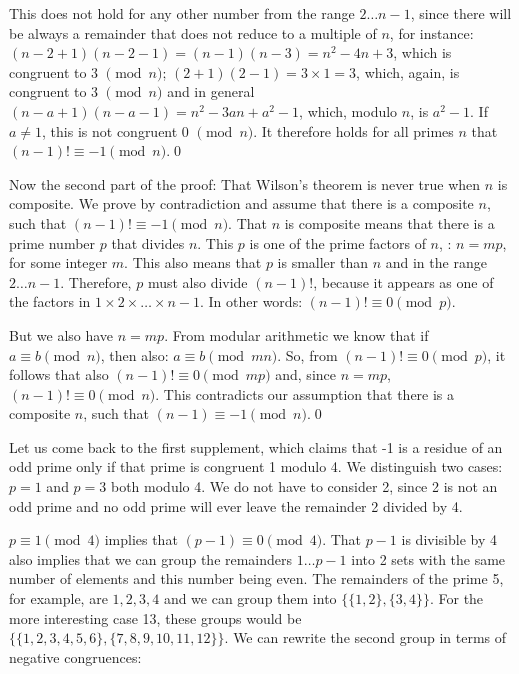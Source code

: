 \documentclass{scrreprt}
\begin{document}
This does not hold for any other number from the range $2\dots n-1$,
since there will be always a remainder that does not reduce
to a multiple of $n$, for instance:
$(n - 2 + 1) (n - 2 - 1) = (n - 1) (n - 3) = n^2 - 4n + 3$,
which is congruent to 3 $\pmod{n}$;
$(2 + 1) (2 - 1) = 3 \times 1 = 3$, which, again, 
is congruent to 3 $\pmod{n}$ and in general
$(n - a + 1)(n - a - 1) = n^2 - 3an + a^2 - 1$,
which, modulo $n$, is $a^2 - 1$.
If $a \neq 1$, this is not congruent 0 $\pmod{n}$.
It therefore holds for all primes $n$ 
that $(n - 1)! \equiv -1 \pmod{n}$.\qed

Now the second part of the proof:
That Wilson's theorem is never true when $n$ is composite.
We prove by contradiction and assume that there is a composite $n$,
such that $(n-1)! \equiv -1 \pmod{n}$.
That $n$ is composite means that there is a prime number $p$
that divides $n$.
This $p$ is one of the prime factors of $n$,
\ie: $n = mp$, for some integer $m$.
This also means that $p$ is smaller than $n$ and 
in the range $2\dots n-1$.
Therefore, $p$ must also divide $(n-1)!$, because 
it appears as one of the factors in $1 \times 2 \times \dots \times n-1$.
In other words: $(n-1)! \equiv 0 \pmod{p}$.

But we also have $n = mp$.
From modular arithmetic we know that 
if $a \equiv b \pmod{n}$, then also: $a \equiv b \pmod{mn}$.
So, from $(n-1)! \equiv 0 \pmod{p}$, it follows that also
$(n-1)! \equiv 0 \pmod{mp}$ and, since $n = mp$,
$(n-1)! \equiv 0 \pmod{n}$. This contradicts our assumption
that there is a composite $n$, such that
$(n-1) \equiv -1 \pmod{n}$.\qed

Let us come back to the first supplement,
which claims that -1 is a residue of an odd prime
only if that prime is congruent 1 modulo 4.
We distinguish two cases: 
$p = 1$ and $p = 3$ both modulo 4.
We do not have to consider 2, since 2 is not an odd prime
and no odd prime will ever leave the remainder 2 
divided by 4.

$p \equiv 1 \pmod{4}$ implies that
$(p - 1) \equiv 0 \pmod{4}$.
That $p - 1$ is divisible by 4 also implies
that we can group the remainders $1\dots p-1$
into 2 sets with the same number of elements
and this number being even.
The remainders of the prime 5, for example,
are $1,2,3,4$ and we can group them into
$\lbrace\lbrace 1,2\rbrace, \lbrace 3,4\rbrace\rbrace$.
For the more interesting case 13, these groups would be
$\lbrace\lbrace 1,2,3,4,5,6\rbrace, \lbrace 7,8,9,10,11,12\rbrace\rbrace$.
We can rewrite the second group in terms of negative congruences:
\end{document}
